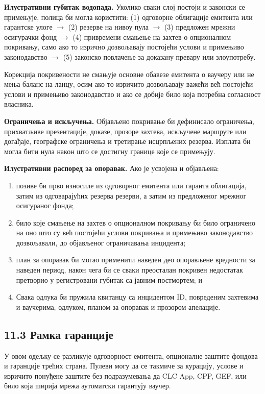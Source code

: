 \documentclass[11pt]{article}
\begin{document}
\textbf{Илустративни губитак водопада.} Уколико сваки слој постоји и законски се примењује, полица би могла користити: (1) одговорне облигације емитента или гарантске улоге $\to$ (2) резерве на нивоу пула $\to$ (3) предложен мрежни осигурачки фонд $\to$ (4) привремени смањење на захтев о опционалном покривању, само ако то изрично дозвољавају постојећи услови и примењиво законодавство $\to$ (5) законско повлачење за доказану превару или злоупотребу.

Корекција покривености не смањује основне обавезе емитента о ваучеру или не мења баланс на ланцу, осим ако то изричито дозвољавају важећи већ постојећи услови и примењиво законодавство и ако се добије било која потребна согласност власника.

\textbf{Ограничења и искључења.} Објављено покривање би дефинисало ограничења, прихватљиве презентације, доказе, прозоре захтева, искључене маршруте или догађаје, географске ограничења и третирање исцрпљених резерва. Изплата би могла бити нула након што се достигну границе које се примењују.

\textbf{Илустративни распоред за опоравак.} Ако је усвојена и објављена:

\begin{enumerate}[leftmargin=*]
\item позиве би прво износиле из одговорног емитента или гаранта облигација, затим из одговарајућих резерва резерви, а затим из предложеног мрежног осигураног фонда;
\item било које смањење на захтев о опционалном покривању би било ограничено на оно што су већ постојећи услови покривања и примењиво законодавство дозвољавали, до објављеног ограничавања инцидента;
\item план за опоравак би могао применити наведен део опорављене вредности за наведен период, након чега би се сваки преосталан покривен недостатак претворио у регистровани губитак са јавним постмортем; и
\item Свака одлука би пружила квитанцу са инцидентом ID, повреденим захтевима и ваучерима, одлуком, планом за опоравак и прозором апелације.
\end{enumerate}
\subsection*{11.3 Рамка гаранције}

У овом одељку се разликује одговорност емитента, опционалне заштите фондова и гаранције трећих страна. Пулеви могу да се такмиче за курацију, услове и изричито понуђене заштите без подразумевања да CLC App, CPP, GEF, или било која ширија мрежа аутоматски гарантују ваучер.
\end{document}
